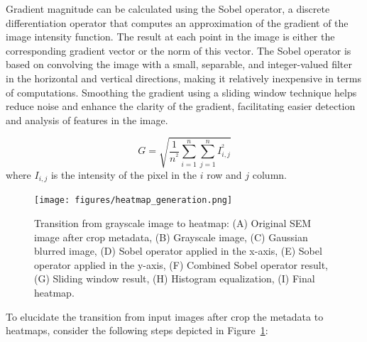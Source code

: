 \documentclass[preprint,12pt]{elsarticle}
\begin{document}
Gradient magnitude can be calculated using the Sobel operator, a discrete differentiation operator that computes an approximation of the gradient of the image intensity function. The result at each point in the image is either the corresponding gradient vector or the norm of this vector. The Sobel operator is based on convolving the image with a small, separable, and integer-valued filter in the horizontal and vertical directions, making it relatively inexpensive in terms of computations. Smoothing the gradient using a sliding window technique helps reduce noise and enhance the clarity of the gradient, facilitating easier detection and analysis of features in the image.

\begin{equation}
\label{eq:gradient}
G=\sqrt{\frac{1}{n^{^2}}\sum_{i=1}^{n}\sum_{j=1}^{n}I_{i,j}^{^2}}
\end{equation}
where $I_{i,j}$ is the intensity of the pixel in the $i$ row and $j$ column.
\begin{figure}[h!]
  \centering
  \texttt{[image: figures/heatmap\_generation.png]}
  \caption{Transition from grayscale image to heatmap: (A) Original SEM image after crop metadata, (B) Grayscale image, (C) Gaussian blurred image, (D) Sobel operator applied in the x-axis, (E) Sobel operator applied in the y-axis, (F) Combined Sobel operator result, (G) Sliding window result, (H) Histogram equalization, (I) Final heatmap.}
  \label{fig:transition_heatmap}
\end{figure}
To elucidate the transition from input images after crop the metadata to heatmaps, consider the following steps depicted in Figure~\ref{fig:transition_heatmap}:
\end{document}
